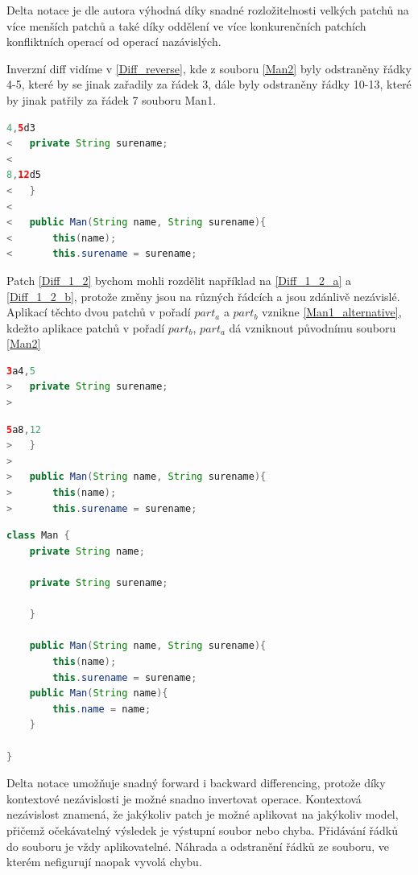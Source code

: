 \documentclass[11pt,twoside,a4paper]{book}
\begin{document}
Delta notace je dle autora výhodná díky snadné
rozložitelnosti velkých patchů na více menších patchů a také díky oddělení ve
více konkurenčních patchích konfliktních operací od operací nazávislých. 

Inverzní diff vidíme v \ref{Diff_reverse}, kde z souboru
\ref{Man2} byly odstraněny řádky 4-5, které by se jinak zařadily za řádek 3,
dále byly odstraněny řádky 10-13, které by jinak patřily za řádek 7 souboru
Man1.


\begin{lstlisting}[language=JAVA,frame=single,caption=patch
$part_b$,label=Diff_reverse]
4,5d3
< 	private String surename;
< 
8,12d5
< 	}
< 
< 	public Man(String name, String surename){
< 		this(name);
< 		this.surename = surename;
\end{lstlisting}

Patch \ref{Diff_1_2} bychom mohli rozdělit například na \ref{Diff_1_2_a} a
\ref{Diff_1_2_b}, protože změny jsou na různých řádcích a jsou zdánlivě
nezávislé. Aplikací těchto dvou patchů v pořadí $part_a$ a $part_b$ vznikne
\ref{Man1_alternative}, kdežto aplikace patchů v pořadí $part_b$, $part_a$ dá
vzniknout původnímu souboru \ref{Man2}

\begin{lstlisting}[language=JAVA,frame=single,caption=patch
$part_a$,label=Diff_1_2_a]
3a4,5
> 	private String surename;
> 
\end{lstlisting}

\begin{lstlisting}[language=JAVA,frame=single,caption=patch
$part_b$,label=Diff_1_2_b]
5a8,12
> 	}
> 
> 	public Man(String name, String surename){
> 		this(name);
> 		this.surename = surename;	
\end{lstlisting}

\begin{lstlisting}[language=JAVA,frame=single,caption=aplikace pořadí
difů $part_a part_b$,label=Man1_alternative] 
class Man {
	private String name;

	private String surename;

	}

	public Man(String name, String surename){
		this(name);
		this.surename = surename;
	public Man(String name){
		this.name = name;
	}

}\end{lstlisting}


Delta notace umožňuje snadný forward i backward differencing, protože díky
kontextové nezávislosti je možné snadno invertovat operace. Kontextová nezávislost znamená,
že jakýkoliv patch je možné aplikovat na jakýkoliv model, přičemž očekávatelný
výsledek je výstupní soubor nebo chyba. Přidávání řádků do souboru je vždy
aplikovatelné. Náhrada a odstranění řádků ze souboru, ve kterém nefigurují
naopak vyvolá chybu. 
\end{document}
